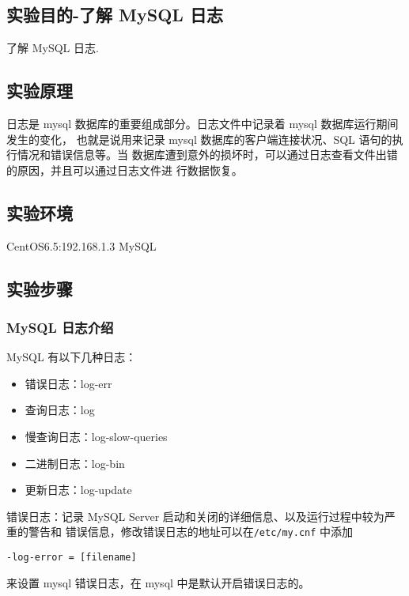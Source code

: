 \subsection{实验目的-了解 MySQL 日志}
了解 MySQL 日志.
%
\subsection{实验原理}
日志是 mysql 数据库的重要组成部分。日志文件中记录着 mysql 数据库运行期间发生的变化，
也就是说用来记录 mysql 数据库的客户端连接状况、SQL 语句的执行情况和错误信息等。当
数据库遭到意外的损坏时，可以通过日志查看文件出错的原因，并且可以通过日志文件进
行数据恢复。
%
\subsection{实验环境}
CentOS6.5:192.168.1.3 MySQL
%
\subsection{实验步骤}
\subsubsection{MySQL 日志介绍}
MySQL 有以下几种日志：
\begin{itemize}
  \item 错误日志：log-err
  \item 查询日志：log
  \item 慢查询日志：log-slow-queries
  \item 二进制日志：log-bin
  \item 更新日志：log-update
\end{itemize}
%
错误日志：记录 MySQL Server 启动和关闭的详细信息、以及运行过程中较为严重的警告和
错误信息，修改错误日志的地址可以在\texttt{/etc/my.cnf} 中添加
\begin{verbatim}
-log-error = [filename]
\end{verbatim}
来设置 mysql 错误日志，在 mysql 中是默认开启错误日志的。

